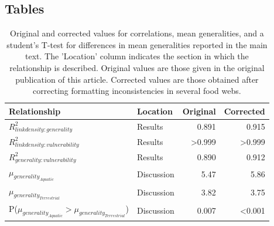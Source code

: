 \documentclass[12pt]{article}
\begin{document}
\begin{spacing}{2.0}
% 
% 

\clearpage

\section*{Tables}

\begin{table}[h!]
\caption{Original and corrected values for correlations, mean generalities, and a student's T-test for differences in mean generalities reported in the main text. The 'Location' column indicates the section in which the relationship is described. Original values are those given in the original publication of this article. Corrected values are those obtained after correcting formatting inconsistencies in several food webs.}
\label{corr_comparison}
\small
\begin{tabular}{l l | r | r}
Relationship & Location & Original & Corrected \\
\hline
$R^2_{link density:generality}$ & Results & 0.891 & 0.915 \\
$R^2_{link density:vulnerability}$ & Results & \textgreater0.999 & \textgreater0.999 \\
$R^2_{generality:vulnerability}$ & Results & 0.890 & 0.912 \\
$\mu_{generality_{Aquatic}}$ & Discussion & 5.47 & 5.86 \\
$\mu_{generality_{Terrestrial}}$ & Discussion & 3.82 & 3.75 \\
P($\mu_{generality_{Aquatic}}>\mu_{generality_{Terrestrial}}$) & Discussion & 0.007 & \textless0.001 \\
\end{tabular}
\end{table}



\end{spacing}
\end{document}
